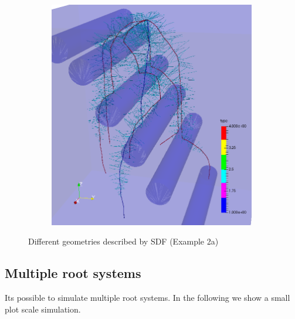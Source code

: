 \documentclass[a4paper]{article}
\begin{document}
\begin{figure}
\begin{subfigure}[c]{0.3\textwidth}
 \label{fig:split}
\end{subfigure}
\begin{subfigure}[c]{0.3\textwidth}
\includegraphics[width=0.99\textwidth]{example_2a3.png}
 \label{fig:rhizotubes}
\end{subfigure}
\caption{Different geometries described by SDF (Example 2a)}
\end{figure}

\subsection{Multiple root systems}

Its possible to simulate multiple root systems. In the following we show a small plot scale simulation.


\end{document}
